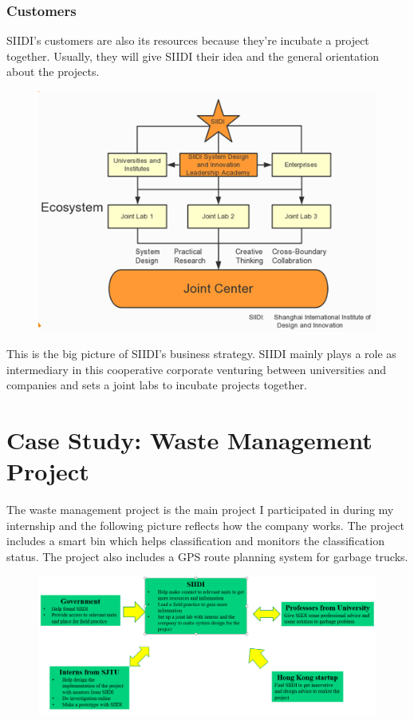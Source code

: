 \documentclass[12pt]{article}
\begin{document}
\subsubsection{Customers}
SIIDI's customers are also its resources because they're incubate a project together. Usually, they will give SIIDI their idea and the general orientation about the projects.
\begin{figure}[H]
\centering
\includegraphics[scale=1]{p1.jpg}
\end{figure}
This is the big picture of SIIDI's business strategy. SIIDI mainly plays a role as intermediary in this cooperative corporate venturing between universities and companies and sets a joint labs to incubate projects together.
\section{Case Study: Waste Management Project}
The waste management project is the main project I participated in during my internship and the  following picture reflects how the company works. The project includes a smart bin which helps classification and monitors the classification status. The project also includes a GPS route planning system for garbage trucks.
\begin{figure}[H]
\centering
\includegraphics[scale=0.4]{p2.jpg}
\end{figure}
\end{document}
